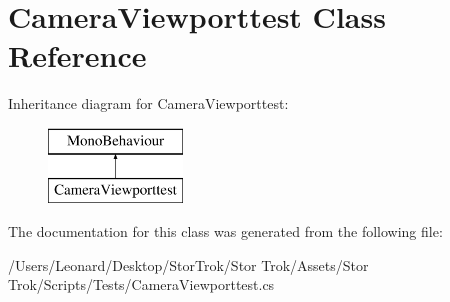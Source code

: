 \hypertarget{class_camera_viewporttest}{}\section{Camera\+Viewporttest Class Reference}
\label{class_camera_viewporttest}
Inheritance diagram for Camera\+Viewporttest\+:\begin{figure}[H]
\begin{center}
\leavevmode
\includegraphics[height=2.000000cm]{class_camera_viewporttest}
\end{center}
\end{figure}


The documentation for this class was generated from the following file\+:\begin{DoxyCompactItemize}
\item 
/\+Users/\+Leonard/\+Desktop/\+Stor\+Trok/\+Stor Trok/\+Assets/\+Stor Trok/\+Scripts/\+Tests/Camera\+Viewporttest.\+cs\end{DoxyCompactItemize}

